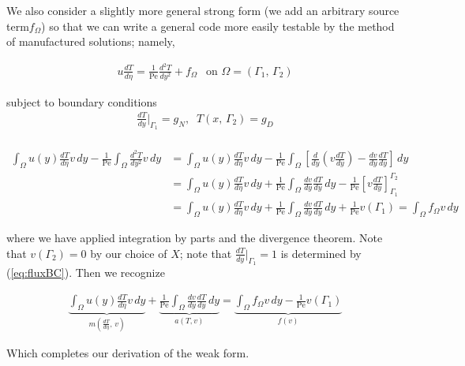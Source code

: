 \documentclass[10pt]{article}
\newcommand{\Pe}{\text{Pe}}
\begin{document}
  We also consider a slightly more general strong form (we add an arbitrary source term$f_\Omega$)
  so that we can write a general code more easily testable by the method of manufactured solutions;
  namely,

    \begin{align*}
      u \frac{dT}{d\eta} = \frac{1}{\Pe} \frac{d^2T}{dy^2} + f_\Omega
      \;\,\text{ on } \Omega=(\Gamma_1,\, \Gamma_2)
    \end{align*}

  subject to boundary conditions
  \begin{align}
    \frac{dT}{dy}\bigg|_{\Gamma_1} = g_N,\;\;
    T(x,\, \Gamma_2) = g_D \\
  \end{align}

    \begin{align*}
      \int_\Omega u(y) \frac{dT}{d\eta} v\, dy 
      - \frac{1}{\Pe} \int_{\Omega}^{} \frac{d^2 T}{dy^2} v\, dy 
      &= \int_\Omega u(y) \frac{dT}{d\eta} v\, dy 
      - \frac{1}{\Pe} \int_{\Omega}^{} \left[ \frac{d}{dy}\left( v \frac{dT}{dy} \right) -
      \frac{dv}{dy} \frac{dT}{dy} \right]\, dy \\
      &= \int_\Omega u(y) \frac{dT}{d\eta} v\, dy 
      + \frac{1}{\Pe} \int_{\Omega}^{} \frac{dv}{dy} \frac{dT}{dy} \, dy 
      - \frac{1}{\Pe}\left[ v \frac{dT}{dy} \right]^{\Gamma_2}_{\Gamma_1} \\
      &= \int_\Omega u(y) \frac{dT}{d\eta} v\, dy
      + \frac{1}{\Pe} \int_{\Omega}^{} \frac{dv}{dy} \frac{dT}{dy} \, dy 
      +\frac{1}{\Pe} v(\Gamma_1)
      = \int_{\Omega}^{} f_\Omega v\, dy
    \end{align*}

    where we have applied integration by parts and the divergence theorem. Note that $v(\Gamma_2) =
    0$ by our choice of $X$; note that $\frac{dT}{dy}\big|_{\Gamma_1}=1$ is determined by
    (\ref{eq:fluxBC}). Then we recognize

    \begin{align}
      \underbrace{\int_\Omega u(y) \frac{dT}{d\eta} v\, dy}_{m\left( \frac{dT}{d\eta},\, v \right)}
      + \underbrace{\frac{1}{\Pe} \int_{\Omega}^{} \frac{dv}{dy} \frac{dT}{dy} \, dy }_{a(T, v) }
      = \underbrace{\int_{\Omega}^{} f_\Omega v\,dy -\frac{1}{\Pe} v(\Gamma_1) }_{f(v)}
    \end{align}

    Which completes our derivation of the weak form. 
\end{document}
